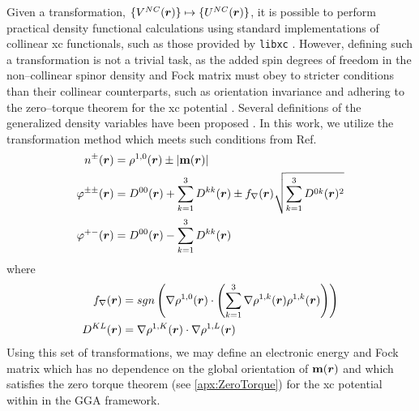 Given a transformation, $\{ V^{NC}(\boldsymbol{r}) \} \mapsto \{U^{NC}(\boldsymbol{r})\}$, it is possible to perform practical
density functional calculations using standard implementations of collinear xc functionals, such
as those provided by \texttt{libxc} \cite{Burnus12_2272,Marques18_1}. However, defining such a transformation is not 
a trivial task, as the added spin degrees of freedom in the non--collinear spinor density and
Fock matrix must obey to stricter conditions than their collinear counterparts, such as orientation
invariance and adhering to the zero--torque theorem for the xc potential \cite{Gyorffy01_206403}.
Several definitions of the generalized density variables have been proposed \cite{Wullen02_779,Ullrich05_073102,Frisch07_125119,Frisch12_2193,Scuseria13_035117}.
In this work, we utilize the transformation method which meets such conditions from Ref.\cite{Li17_2591} 
\begin{subequations}
  \label{eq:NCtrans}
  \begin{align}    
    n^\pm(\boldsymbol{r})        & = \rho^{1,0}(\boldsymbol{r}) \pm \vert\mathbf{m}(\boldsymbol{r})\vert\\
     \varphi^{\pm\pm}(\boldsymbol{r}) & = D^{00}(\boldsymbol{r})   + \sum_{k=1}^3 D^{kk} (\boldsymbol{r}) 
                           \pm f_{\nabla}(\boldsymbol{r})\sqrt{ \sum_{k=1}^3 D^{0k}(\boldsymbol{r})^2} \\
     \varphi^{+-}(\boldsymbol{r})      & = D^{00} (\boldsymbol{r})
                           - \sum_{k=1}^3 D^{kk} (\boldsymbol{r})
  \end{align}
\end{subequations}
where
\begin{align}  
  f_{\nabla}(\boldsymbol{r}) & = sgn\left(\nabla\rho^{1,0} (\boldsymbol{r}) \cdot \left(\sum_{k=1}^3 \nabla \rho^{1,k}(\boldsymbol{r}) \rho^{1,k}(\boldsymbol{r}) \right)\right) \\
  D^{KL} (\boldsymbol{r})      &  = \nabla\rho^{1,K} (\boldsymbol{r}) \cdot  \nabla \rho^{1,L} (\boldsymbol{r})  
\end{align} 
Using this set of transformations, we may define an electronic energy and Fock matrix which has no dependence
on the global orientation of $\mathbf{m}(\boldsymbol{r})$ and which satisfies the zero torque theorem (see \cref{apx:ZeroTorque}) for
the xc potential within in the GGA framework.

